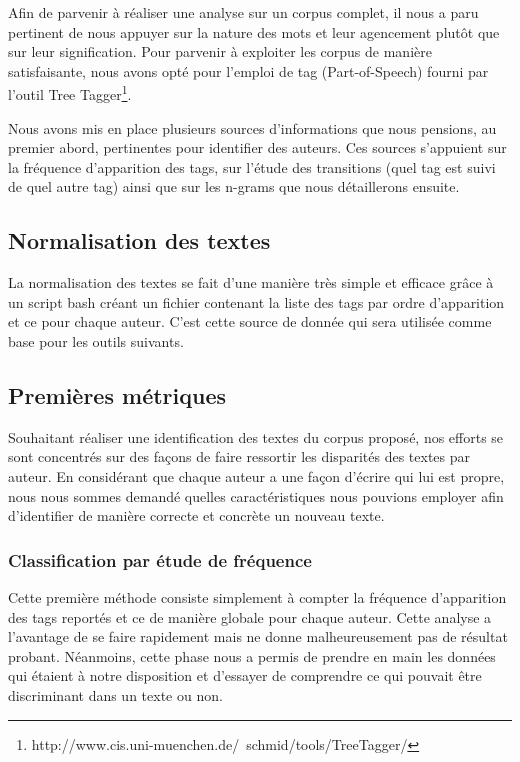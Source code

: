 \documentclass[a4paper]{article}
\begin{document}
Afin de parvenir à réaliser une analyse sur un corpus complet, il nous a paru pertinent de nous appuyer sur la nature des mots et leur agencement plutôt que sur leur signification. Pour parvenir à exploiter les corpus de manière satisfaisante, nous avons opté pour l'emploi de tag (Part-of-Speech) fourni par l'outil Tree Tagger\footnote{http://www.cis.uni-muenchen.de/~schmid/tools/TreeTagger/}.

Nous avons mis en place plusieurs sources d'informations que nous pensions, au premier abord, pertinentes pour identifier des auteurs. Ces sources s'appuient sur la fréquence d'apparition des tags, sur l'étude des transitions (quel tag est suivi de quel autre tag) ainsi que sur les n-grams que nous détaillerons ensuite.



\subsection{Normalisation des textes}

La normalisation des textes se fait d'une manière très simple et efficace grâce à un script bash créant un fichier contenant la liste des tags par ordre d'apparition et ce pour chaque auteur. C'est cette source de donnée qui sera utilisée comme base pour les outils suivants. 

\subsection{Premières métriques}

Souhaitant réaliser une identification des textes du corpus proposé, nos efforts se sont concentrés sur des façons de faire ressortir les disparités des textes par auteur. En considérant que chaque auteur a une façon d'écrire qui lui est propre, nous nous sommes demandé quelles caractéristiques nous pouvions employer afin d'identifier de manière correcte et concrète un nouveau texte.

\subsubsection{Classification par étude de fréquence}

Cette première méthode consiste simplement à compter la fréquence d'apparition des tags reportés et ce de manière globale pour chaque auteur. Cette analyse a l'avantage de se faire rapidement mais ne donne malheureusement pas de résultat probant. Néanmoins, cette phase nous a permis de prendre en main les données qui étaient à notre disposition et d'essayer de comprendre ce qui pouvait être discriminant dans un texte ou non.
\end{document}
